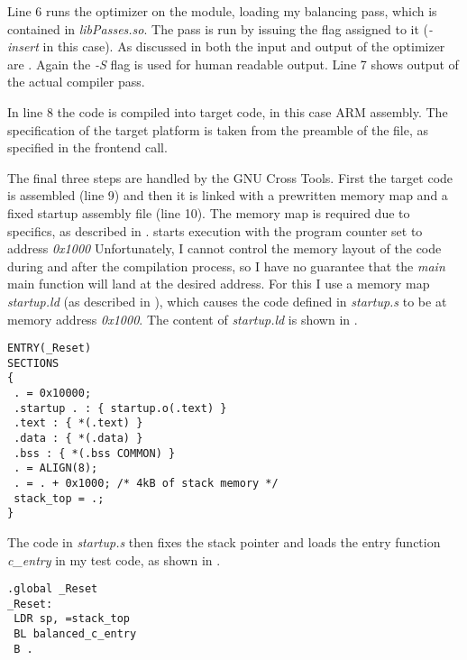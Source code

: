 Line 6 runs the \llvm{} optimizer on the module, loading my balancing pass, which is contained in \emph{libPasses.so}.
The pass is run by issuing the flag assigned to it (\emph{-insert} in this case).
As discussed in  both the input and output of the optimizer are \ir{}.
Again the \emph{-S} flag is used for human readable output.
Line 7 shows output of the actual compiler pass.

In line 8 the \ir{} code is compiled into target code, in this case ARM assembly.
The specification of the target platform is taken from the preamble of the \ir{} file, as specified in the frontend call.

The final three steps are handled by the GNU Cross Tools.
First the target code is assembled (line 9) and then it is linked with a prewritten memory map and a fixed startup assembly file (line 10).
The memory map is required due to \qemu{} specifics, as described in .
\qemu{} starts execution with the program counter set to address \emph{0x1000} 
Unfortunately, I cannot control the memory layout of the code during and after the compilation process, so I have no guarantee that the \emph{main} main function will land at the desired address.
For this I use a memory map \emph{startup.ld} (as described in \cite{armbare}), which causes the code defined in \emph{startup.s} to be at memory address \emph{0x1000}.
The content of \emph{startup.ld} is shown in .

\begin{lstlisting}[caption=Memory map in \emph{startup.ld}, label=lst:mmap]
ENTRY(_Reset)
SECTIONS
{
 . = 0x10000;
 .startup . : { startup.o(.text) }
 .text : { *(.text) }
 .data : { *(.data) }
 .bss : { *(.bss COMMON) }
 . = ALIGN(8);
 . = . + 0x1000; /* 4kB of stack memory */
 stack_top = .;
}
\end{lstlisting}

The code in \emph{startup.s} then fixes the stack pointer and loads the entry function \emph{c\_entry} in my test code, as shown in .

\begin{lstlisting}[caption=Startup assembly code, label=lst:startup]
.global _Reset
_Reset:
 LDR sp, =stack_top
 BL balanced_c_entry
 B .
\end{lstlisting}
